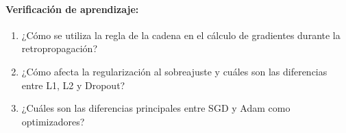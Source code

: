 \documentclass[a4,11pt]{aleph-notas}
\begin{document}
\paragraph{Verificación de aprendizaje:}
\begin{enumerate}[leftmargin=*]
    \item ¿Cómo se utiliza la regla de la cadena en el cálculo de gradientes durante la retropropagación?
    
    \item ¿Cómo afecta la regularización al sobreajuste y cuáles son las diferencias entre L1, L2 y Dropout?
    
    \item ¿Cuáles son las diferencias principales entre SGD y Adam como optimizadores?
\end{enumerate}
\end{document}
